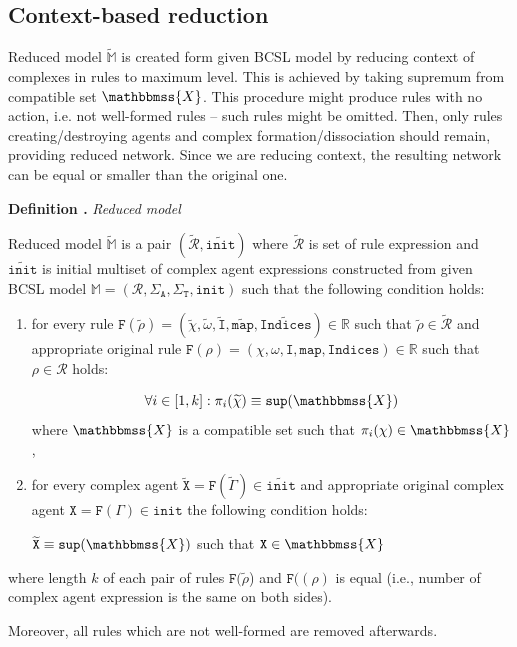 \documentclass[12pt]{fithesis2}
\newcounter{counter}[section]
\renewcommand{\thecounter}{\thesection.\arabic{counter}}
\newenvironment{definition}[1]{\bigskip\refstepcounter{counter}\noindent\textbf{Definition \thecounter } \textit{#1} \par\nopagebreak}{\bigskip}
\begin{document}
\subsection{Context-based reduction}
\label{context_reduction}

Reduced model $\widetilde{\mathds{M}}$ is created form given BCSL model by reducing context of complexes in rules to maximum level. This is achieved by taking supremum from compatible set $\mathbbmss{X}$. This procedure might produce rules with no action, i.e. not well-formed rules -- such rules might be omitted. Then, only rules creating/destroying agents and complex formation/dissociation should remain, providing reduced network. Since we are reducing context, the resulting network can be equal or smaller than the original one.

\begin{definition}{Reduced model}
\label{reduced_model}
Reduced model $\widetilde{\mathds{M}}$ is a pair $(\widetilde{\mathcal{R}}, \widetilde{\mathtt{init}})$ where $\widetilde{\mathcal{R}}$ is set of rule expression and $\widetilde{\mathtt{init}}$ is initial multiset of complex agent expressions constructed from given BCSL model $\mathds{M} = (\mathcal{R}, \Sigma_\mathtt{A}, \Sigma_\mathtt{T}, \mathtt{init})$ such that the following condition holds:

\begin{enumerate}
	\item for every rule $\mathtt{F}(\widetilde{\rho}) = (\widetilde{\chi}, \widetilde{\omega}, \widetilde{\mathtt{I}}, \widetilde{\mathtt{map}}, \widetilde{\mathtt{Indices}}) \in \mathds{R}$ such that $\widetilde{\rho} \in \widetilde{\mathcal{R}}$ and appropriate original rule $\mathtt{F}(\rho) = (\chi, \omega, \mathtt{I}, \mathtt{map}, \mathtt{Indices}) \in \mathds{R}$ such that $\rho \in \mathcal{R}$ holds:

	$$\forall i \in [1, k]: \pi_i(\widetilde{\chi}) \equiv \mathtt{sup}(\mathbbmss{X})$$ where $\mathbbmss{X}$ is a compatible set such that $\pi_i(\chi) \in \mathbbmss{X}$,

	\item for every complex agent $\widetilde{\mathtt{X}} = \mathtt{F}(\widetilde{\Gamma}) \in \widetilde{\mathtt{init}}$ and appropriate original complex agent $\mathtt{X} = \mathtt{F}(\Gamma) \in \mathtt{init}$ the following condition holds:

	\begin{center}
	$ \widetilde{\mathtt{X}} \equiv \mathtt{sup}(\mathbbmss{X}) $ such that $\mathtt{X} \in \mathbbmss{X}$
	\end{center}

\end{enumerate}

where length $k$ of each pair of rules $\mathtt{F}(\widetilde{\rho}$) and $\mathtt{F}((\rho)$ is equal (i.e., number of complex agent expression is the same on both sides).

Moreover, all rules which are not well-formed are removed afterwards.
\end{definition}
\end{document}
